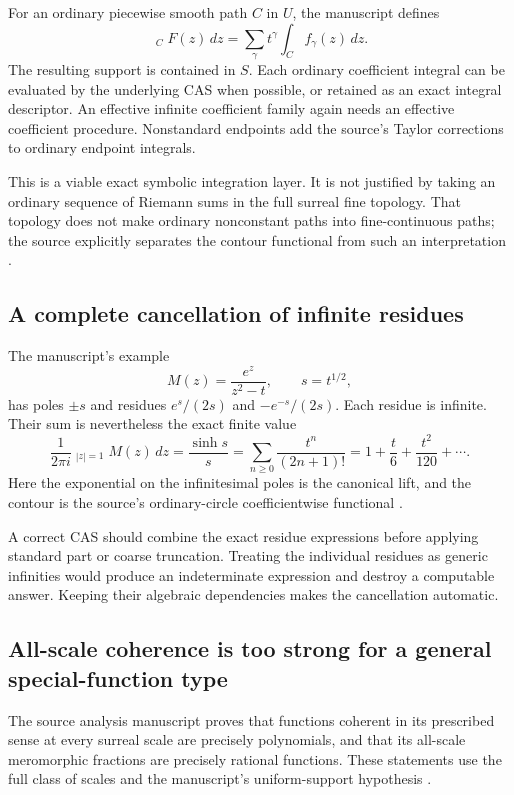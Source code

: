 \documentclass[11pt,letterpaper]{article}
\theoremstyle{definition}
\newcommand{\HInt}{\mathop{\int^{\!H}}}
\numberwithin{equation}{section}
\begin{document}
For an ordinary piecewise smooth path $C$ in $U$, the manuscript defines
\begin{equation}\label{eq:contour}
 \HInt_C F(z)\,dz
   =\sum_\gamma t^\gamma\int_C f_\gamma(z)\,dz.
\end{equation}
The resulting support is contained in $S$. Each ordinary coefficient integral can be evaluated by the underlying CAS when possible, or retained as an exact integral descriptor. An effective infinite coefficient family again needs an effective coefficient procedure. Nonstandard endpoints add the source's Taylor corrections to ordinary endpoint integrals.

This is a viable exact symbolic integration layer. It is not justified by taking an ordinary sequence of Riemann sums in the full surreal fine topology. That topology does not make ordinary nonconstant paths into fine-continuous paths; the source explicitly separates the contour functional from such an interpretation \cite[\S6]{SourceAnalysis}.

\subsection{A complete cancellation of infinite residues}
The manuscript's example
\[
 M(z)=\frac{e^z}{z^2-t},\qquad s=t^{1/2},
\]
has poles $\pm s$ and residues $e^s/(2s)$ and $-e^{-s}/(2s)$. Each residue is infinite. Their sum is nevertheless the exact finite value
\begin{equation}\label{eq:residue}
 \frac1{2\pi i}\HInt_{|z|=1}M(z)\,dz
  =\frac{\sinh s}{s}
  =\sum_{n\ge0}\frac{t^n}{(2n+1)!}
  =1+\frac t6+\frac{t^2}{120}+\cdots.
\end{equation}
Here the exponential on the infinitesimal poles is the canonical lift, and the contour is the source's ordinary-circle coefficientwise functional \cite[``An explicit cancellation of infinite residues'']{SourceAnalysis}.

A correct CAS should combine the exact residue expressions before applying standard part or coarse truncation. Treating the individual residues as generic infinities would produce an indeterminate expression and destroy a computable answer. Keeping their algebraic dependencies makes the cancellation automatic.

\subsection{All-scale coherence is too strong for a general special-function type}
The source analysis manuscript proves that functions coherent in its prescribed sense at every surreal scale are precisely polynomials, and that its all-scale meromorphic fractions are precisely rational functions. These statements use the full class of scales and the manuscript's uniform-support hypothesis \cite[``Affine scales and global rigidity'']{SourceAnalysis}.
\end{document}
